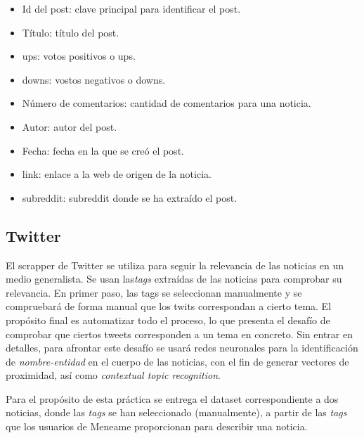 \documentclass[a4paper,12pt]{article}
\begin{document}
\begin{itemize}

\item Id del post: clave principal para identificar el post.

\item T\'itulo: t\'itulo del post.

\item ups: votos  positivos o ups.

\item downs: vostos negativos o downs.

\item N\'umero de comentarios: cantidad de comentarios para una noticia.

\item Autor: autor del post.

\item Fecha: fecha en la que se cre\'o el post.

\item link: enlace a la web de origen de la noticia.

\item subreddit: subreddit donde se ha extra\'ido el post.
\end{itemize}


\subsection{Twitter}

El scrapper de Twitter se utiliza para seguir la relevancia de las noticias en un medio generalista. Se usan las{\itshape tags} extra\'idas de las noticias para comprobar su relevancia. En primer paso, las tags se seleccionan manualmente y se compruebar\'a de forma manual que los twits correspondan a cierto tema. El prop\'osito final es automatizar todo el proceso, lo que presenta el desaf\'io de comprobar que ciertos tweets corresponden a un tema en concreto. Sin entrar en detalles, para afrontar este desaf\'io se usar\'a redes neuronales para la identificaci\'on de {\itshape nombre-entidad} en el cuerpo de las noticias, con el fin de generar vectores de proximidad, as\'i como {\itshape contextual topic recognition}.

Para el prop\'osito de esta pr\'actica se entrega el dataset correspondiente a dos noticias, donde las {\itshape tags} se han seleccionado (manualmente), a partir de las {\itshape tags} que los usuarios de Meneame proporcionan para describir una noticia.
\end{document}
